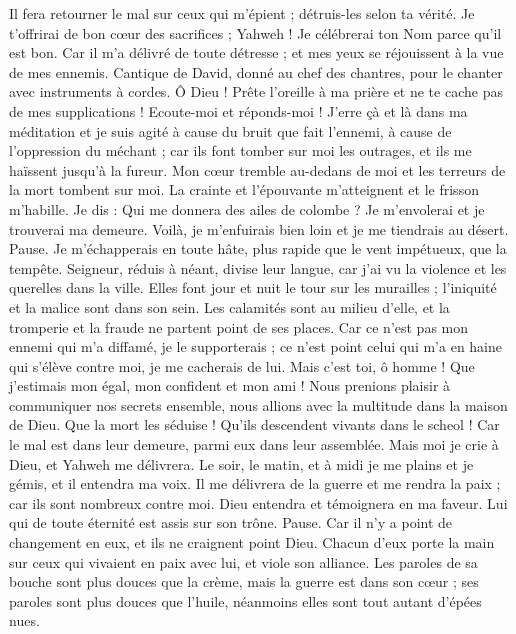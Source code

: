 \begin{multicols}{2}
Il fera retourner le mal sur ceux qui m'épient ; détruis-les selon ta vérité.
Je t’offrirai de bon cœur des sacrifices ; Yahweh ! Je célébrerai ton Nom parce qu'il est bon.
Car il m'a délivré de toute détresse ; et mes yeux se réjouissent à la vue de mes ennemis.
\VerseOne{}Cantique de David, donné au chef des chantres, pour le chanter avec instruments à cordes.
Ô Dieu ! Prête l'oreille à ma prière et ne te cache pas de mes supplications !
Ecoute-moi et réponds-moi ! J’erre çà et là dans ma méditation et je suis agité
à cause du bruit que fait l'ennemi, à cause de l'oppression du méchant ; car ils font tomber sur moi les outrages, et ils me haïssent jusqu’à la fureur.
Mon cœur tremble au-dedans de moi et les terreurs de la mort tombent sur moi.
La crainte et l’épouvante m’atteignent et le frisson m’habille.
Je dis : Qui me donnera des ailes de colombe ? Je m'envolerai et je trouverai ma demeure.
Voilà, je m'enfuirais bien loin et je me tiendrais au désert. Pause.
Je m’échapperais en toute hâte, plus rapide que le vent impétueux, que la tempête.
Seigneur, réduis à néant, divise leur langue, car j'ai vu la violence et les querelles dans la ville.
Elles font jour et nuit le tour sur les murailles ; l’iniquité et la malice sont dans son sein.
Les calamités sont au milieu d'elle, et la tromperie et la fraude ne partent point de ses places.
Car ce n'est pas mon ennemi qui m'a diffamé, je le supporterais ; ce n'est point celui qui m'a en haine qui s'élève contre moi, je me cacherais de lui.
Mais c'est toi, ô homme ! Que j’estimais mon égal, mon confident et mon ami !
Nous prenions plaisir à communiquer nos secrets ensemble, nous allions avec la multitude dans la maison de Dieu.
Que la mort les séduise ! Qu'ils descendent vivants dans le scheol ! Car le mal est dans leur demeure, parmi eux dans leur assemblée.
Mais moi je crie à Dieu, et Yahweh me délivrera.
Le soir, le matin, et à midi je me plains et je gémis, et il entendra ma voix.
Il me délivrera de la guerre et me rendra la paix ; car ils sont nombreux contre moi.
Dieu entendra et témoignera en ma faveur. Lui qui de toute éternité est assis sur son trône. Pause. Car il n'y a point de changement en eux, et ils ne craignent point Dieu.
Chacun d'eux porte la main sur ceux qui vivaient en paix avec lui, et viole son alliance.
Les paroles de sa bouche sont plus douces que la crème, mais la guerre est dans son cœur ; ses paroles sont plus douces que l'huile, néanmoins elles sont tout autant d'épées nues.

\end{multicols}
